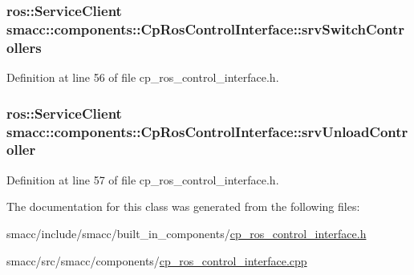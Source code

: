 \subsubsection[{\texorpdfstring{srv\+Switch\+Controllers}{srvSwitchControllers}}]{\setlength{\rightskip}{0pt plus 5cm}ros\+::\+Service\+Client smacc\+::components\+::\+Cp\+Ros\+Control\+Interface\+::srv\+Switch\+Controllers\hspace{0.3cm}{\ttfamily [private]}}\hypertarget{classsmacc_1_1components_1_1CpRosControlInterface_a78e45e68567c23ca5c19df0de257c20f}{}\label{classsmacc_1_1components_1_1CpRosControlInterface_a78e45e68567c23ca5c19df0de257c20f}


Definition at line 56 of file cp\+\_\+ros\+\_\+control\+\_\+interface.\+h.

\subsubsection[{\texorpdfstring{srv\+Unload\+Controller}{srvUnloadController}}]{\setlength{\rightskip}{0pt plus 5cm}ros\+::\+Service\+Client smacc\+::components\+::\+Cp\+Ros\+Control\+Interface\+::srv\+Unload\+Controller\hspace{0.3cm}{\ttfamily [private]}}\hypertarget{classsmacc_1_1components_1_1CpRosControlInterface_a0515a2a86bfcd0fdec08fabd3070723c}{}\label{classsmacc_1_1components_1_1CpRosControlInterface_a0515a2a86bfcd0fdec08fabd3070723c}


Definition at line 57 of file cp\+\_\+ros\+\_\+control\+\_\+interface.\+h.



The documentation for this class was generated from the following files\+:\begin{DoxyCompactItemize}
\item 
smacc/include/smacc/built\+\_\+in\+\_\+components/\hyperlink{cp__ros__control__interface_8h}{cp\+\_\+ros\+\_\+control\+\_\+interface.\+h}\item 
smacc/src/smacc/components/\hyperlink{cp__ros__control__interface_8cpp}{cp\+\_\+ros\+\_\+control\+\_\+interface.\+cpp}\end{DoxyCompactItemize}
